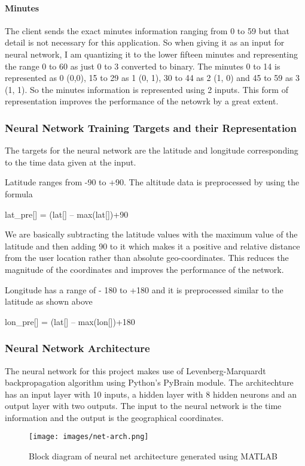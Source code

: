 \documentclass[conference]{IEEEtran}
\begin{document}
\paragraph{Minutes}
The client sends the exact minutes information ranging from 0 to 59 but that detail is not necessary for this application. So when giving it as an input for neural network, I am quantizing it to the lower fifteen minutes and representing the range 0 to 60 as just 0 to 3 converted to binary. The minutes 0 to 14 is represented as 0 (0,0), 15 to 29 as 1 (0, 1), 30 to 44 as 2 (1, 0) and 45 to 59 as 3 (1, 1). So the minutes information is represented using 2 inputs. This form of representation improves the performance of the netowrk by a great extent.

\subsubsection{Neural Network Training Targets and their Representation}
The targets for the neural network are the latitude and longitude corresponding to the time data given at the input.

Latitude ranges from -90 to +90. The altitude data is preprocessed by using the formula 

lat\_pre[] = (lat[] – max(lat[])+90

We are basically subtracting the latitude values with the maximum value of the latitude and then adding 90 to it which makes it a positive and relative distance from the user location rather than absolute geo-coordinates. This reduces the magnitude of the coordinates and improves the performance of the network.

Longitude has a range of - 180 to +180 and it is preprocessed similar to the latitude as shown above 

lon\_pre[] = (lat[] – max(lon[])+180

\subsubsection{Neural Network Architecture}
The neural network for this project makes use of Levenberg-Marquardt backpropagation algorithm using Python's PyBrain module. The architechture has an input layer with 10 inputs, a hidden layer with 8 hidden neurons and an output layer with two outputs. The input to the neural network is the time information and the output is the geographical coordinates.

\begin{figure}[h]
  \centering
  \texttt{[image: images/net-arch.png]}
  \caption[NETWORK ARCHITECTURE]
   {Block diagram of neural net architecture generated using MATLAB}
   \label{fig:serv_net_arch}
\end{figure}
\end{document}

